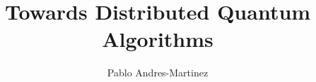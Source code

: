 \documentclass[mscres, lfcs, twoside, logo]{infthesis}
\title{Towards Distributed Quantum Algorithms}
\author{Pablo Andres-Martinez}
\begin{document}


\begin{preliminary}

\maketitle

\begin{acknowledgements}
\end{acknowledgements}

\standarddeclaration


\tableofcontents


\end{preliminary}








\appendix







\end{document}
